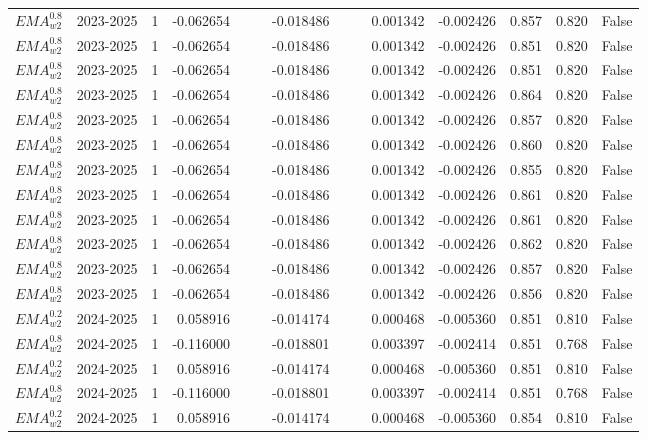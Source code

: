 \begin{tabular}{@{}llrrrrrrrrrlll@{}}
$EMA^{0.8}_{w2}$ & 2023-2025 & 1 & -0.062654 &  &  & -0.018486 &  &  & 0.001342 & -0.002426 & 0.857 & 0.820 & False \\
$EMA^{0.8}_{w2}$ & 2023-2025 & 1 & -0.062654 &  &  & -0.018486 &  &  & 0.001342 & -0.002426 & 0.851 & 0.820 & False \\
$EMA^{0.8}_{w2}$ & 2023-2025 & 1 & -0.062654 &  &  & -0.018486 &  &  & 0.001342 & -0.002426 & 0.851 & 0.820 & False \\
$EMA^{0.8}_{w2}$ & 2023-2025 & 1 & -0.062654 &  &  & -0.018486 &  &  & 0.001342 & -0.002426 & 0.864 & 0.820 & False \\
$EMA^{0.8}_{w2}$ & 2023-2025 & 1 & -0.062654 &  &  & -0.018486 &  &  & 0.001342 & -0.002426 & 0.857 & 0.820 & False \\
$EMA^{0.8}_{w2}$ & 2023-2025 & 1 & -0.062654 &  &  & -0.018486 &  &  & 0.001342 & -0.002426 & 0.860 & 0.820 & False \\
$EMA^{0.8}_{w2}$ & 2023-2025 & 1 & -0.062654 &  &  & -0.018486 &  &  & 0.001342 & -0.002426 & 0.855 & 0.820 & False \\
$EMA^{0.8}_{w2}$ & 2023-2025 & 1 & -0.062654 &  &  & -0.018486 &  &  & 0.001342 & -0.002426 & 0.861 & 0.820 & False \\
$EMA^{0.8}_{w2}$ & 2023-2025 & 1 & -0.062654 &  &  & -0.018486 &  &  & 0.001342 & -0.002426 & 0.861 & 0.820 & False \\
$EMA^{0.8}_{w2}$ & 2023-2025 & 1 & -0.062654 &  &  & -0.018486 &  &  & 0.001342 & -0.002426 & 0.862 & 0.820 & False \\
$EMA^{0.8}_{w2}$ & 2023-2025 & 1 & -0.062654 &  &  & -0.018486 &  &  & 0.001342 & -0.002426 & 0.857 & 0.820 & False \\
$EMA^{0.8}_{w2}$ & 2023-2025 & 1 & -0.062654 &  &  & -0.018486 &  &  & 0.001342 & -0.002426 & 0.856 & 0.820 & False \\
$EMA^{0.2}_{w2}$ & 2024-2025 & 1 & 0.058916 &  &  & -0.014174 &  &  & 0.000468 & -0.005360 & 0.851 & 0.810 & False \\
$EMA^{0.8}_{w2}$ & 2024-2025 & 1 & -0.116000 &  &  & -0.018801 &  &  & 0.003397 & -0.002414 & 0.851 & 0.768 & False \\
$EMA^{0.2}_{w2}$ & 2024-2025 & 1 & 0.058916 &  &  & -0.014174 &  &  & 0.000468 & -0.005360 & 0.851 & 0.810 & False \\
$EMA^{0.8}_{w2}$ & 2024-2025 & 1 & -0.116000 &  &  & -0.018801 &  &  & 0.003397 & -0.002414 & 0.851 & 0.768 & False \\
$EMA^{0.2}_{w2}$ & 2024-2025 & 1 & 0.058916 &  &  & -0.014174 &  &  & 0.000468 & -0.005360 & 0.854 & 0.810 & False \\

\end{tabular}
